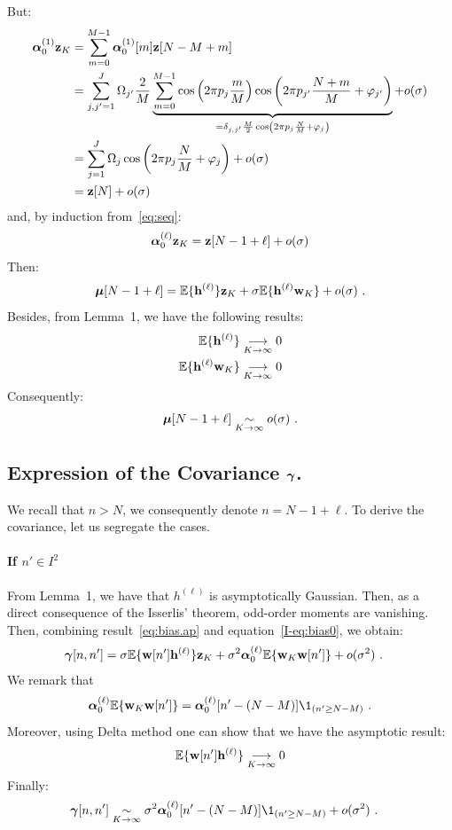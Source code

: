 \documentclass[journal,onecolumn]{IEEEtran}
\begin{document}
But:
\begin{align*}
\boldsymbol{\alpha}_0^{(1)}{\mathbf z}_{K} &=\sum_{m=0}^{M-1}\boldsymbol{\alpha}_0^{(1)}[m]{\mathbf z}[N-M+m] \\
&=\sum_{j,j'=1}^J\Omega_{j'}\dfrac{2}{M}\underbrace{\sum_{m=0}^{M-1}\cos\left(2\pi p_j\frac{m}{M}\right)\cos\left(2\pi p_{j'}\dfrac{N+m}{M}+\varphi_{j'}\right)}_{=\delta_{j,j'}\frac{M}2\cos\left(2\pi p_j\frac{N}M +\varphi_{j}\right)} + o(\sigma) \\
&= \sum_{j=1}^J\Omega_j\cos\left(2\pi p_j\dfrac{N}{M}+\varphi_j\right) + o(\sigma) \\
&= {\mathbf z}[N] + o(\sigma)
\end{align*}
and, by induction from~\eqref{eq:seq}:
\begin{equation}
\label{eq:alpha0z.sine}
\balpha_0^{(\ell)}\bz_{K} = \bz[N-1+\ell] + o(\sigma)
\end{equation}
Then:
\begin{equation*}
\boldsymbol{\mu}[N-1+\ell] = {\mathbb E}\{{\mathbf h}^{(\ell)}\}{\mathbf z}_{K} + \sigma{\mathbb E}\{{\mathbf h}^{(\ell)}{\mathbf w}_{K}\} + o(\sigma)\ .
\end{equation*}
Besides, from Lemma~1, we have the following results:
\begin{align*}
{\mathbb E}\{{\mathbf h}^{(\ell)}\} &\underset{K\to\infty}{\longrightarrow} 0\\
{\mathbb E}\{{\mathbf h}^{(\ell)}{\mathbf w}_{K}\} &\underset{K\to\infty}{\longrightarrow} 0
\end{align*}
Consequently:
\begin{equation}
\bmu[N-1+\ell] \underset{K\to\infty}{\sim} o(\sigma)\ .
\label{eq:bias.ap}
\end{equation}


\subsection{Expression of the Covariance $\boldsymbol{\gamma}$.}
We recall that $n>N$, we consequently denote $n=N-1+\ell$.  To derive the covariance, let us segregate the cases. 
 
\paragraph{If $n'\in I^2$}
From Lemma~1, we have that $h^{(\ell)}$ is asymptotically Gaussian. Then, as a direct consequence of the Isserlis' theorem, odd-order moments are vanishing. Then, combining result~\eqref{eq:bias.ap} and equation~\eqref{I-eq:bias0}, we obtain:
\begin{align*}
\boldsymbol{\gamma}[n,n'] &= \sigma{\mathbb E}\{{\mathbf w}[n']{\mathbf h}^{(\ell)}\}{\mathbf z}_K + \sigma^2\boldsymbol{\alpha}_0^{(\ell)}{\mathbb E}\{{\mathbf w}_K{\mathbf w}[n']\} + o(\sigma^2) \ .
\end{align*}
We remark that
\[
\balpha_0^{(\ell)}\EE\{\bw_K\bw[n']\}=\balpha_0^{(\ell)}[n'-(N-M)]\1_{(n'\geq N-M)}\ .
\]
Moreover, using Delta method one can show that we have the asymptotic result:
\begin{equation}
\EE\{\bw[n']\bh^{(\ell)}\} \underset{K\to\infty}{\longrightarrow} 0
\label{eq:cov.ap}
\end{equation}
Finally:
\begin{align*}
\bgamma[n,n'] &\underset{K\to\infty}{\sim} \sigma^2\balpha_0^{(\ell)}[n'-(N-M)]\1_{(n'\geq N-M)} + o(\sigma^2) \ .
\end{align*}
\end{document}
